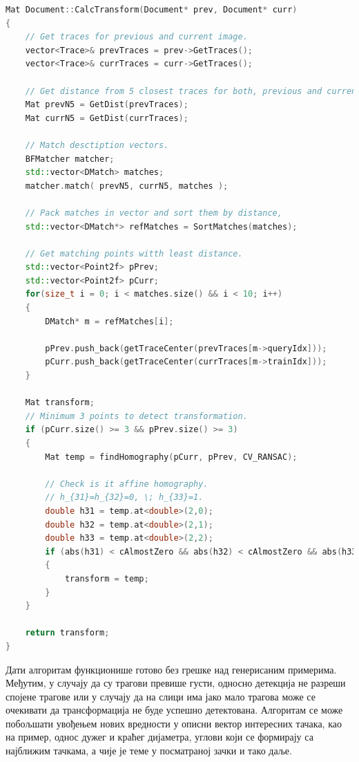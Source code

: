 \documentclass[12pt,a4paper,serbian,oneside]{book}
\begin{document}
 \begin{lstlisting}[language=C++,label=lst:surf,caption=Поређење описних вектора и одређивање ротације нове слике]
Mat Document::CalcTransform(Document* prev, Document* curr)
{
    // Get traces for previous and current image.
    vector<Trace>& prevTraces = prev->GetTraces();
    vector<Trace>& currTraces = curr->GetTraces();

    // Get distance from 5 closest traces for both, previous and current image.
    Mat prevN5 = GetDist(prevTraces);
    Mat currN5 = GetDist(currTraces);

    // Match desctiption vectors.
    BFMatcher matcher;
    std::vector<DMatch> matches;
    matcher.match( prevN5, currN5, matches );

    // Pack matches in vector and sort them by distance,
    std::vector<DMatch*> refMatches = SortMatches(matches);

    // Get matching points witth least distance.
    std::vector<Point2f> pPrev;
    std::vector<Point2f> pCurr;
    for(size_t i = 0; i < matches.size() && i < 10; i++)
    {
        DMatch* m = refMatches[i];

        pPrev.push_back(getTraceCenter(prevTraces[m->queryIdx]));
        pCurr.push_back(getTraceCenter(currTraces[m->trainIdx]));
    }

    Mat transform;
    // Minimum 3 points to detect transformation.
    if (pCurr.size() >= 3 && pPrev.size() >= 3)
    {
        Mat temp = findHomography(pCurr, pPrev, CV_RANSAC);

        // Check is it affine homography.
        // h_{31}=h_{32}=0, \; h_{33}=1.
        double h31 = temp.at<double>(2,0);
        double h32 = temp.at<double>(2,1);
        double h33 = temp.at<double>(2,2);
        if (abs(h31) < cAlmostZero && abs(h32) < cAlmostZero && abs(h33 - 1) < cAlmostZero)
        {
            transform = temp;
        }
    }

    return transform;
}
\end{lstlisting}

Дати алгоритам функционише готово без грешке над генерисаним примерима. Међутим, у случају да су трагови превише густи, односно детекција не разреши спојене трагове или у случају да на слици има јако мало трагова може се очекивати да трансформација не буде успешно детектована. Алгоритам се може побољшати увођењем нових вредности у описни вектор интересних тачака, као на пример, однос дужег и краћег дијаметра, углови који се формирају са најближим тачкама, а чије је теме у посматраној зачки и тако даље. 
\end{document}
